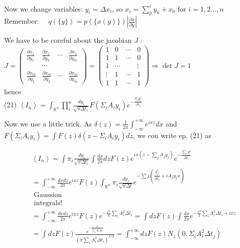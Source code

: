 \documentclass[10pt]{article}
\begin{document}
Now we change variables: $y_{i}=\Delta x_{i}$, so $x_{i}=\sum_{p}^{i} y_{k}+x_{0}$ for $i=1,2 \ldots, n$\\
Remember: $\quad q(\{y\})=p(\{x(y)\})\left|\frac{\partial x}{\partial y}\right|$

We have to be coreful about the jacobian $J$ :\\
$J=\left(\begin{array}{cccc}\frac{\partial x_{1}}{\partial y_{1}} & \frac{\partial x_{1}}{\partial y_{2}} & \cdots & \frac{\partial x_{1}}{\partial y_{m}} \\ & \cdots & & \\ \frac{\partial x_{m}}{\partial y_{1}} & \frac{\partial x_{m}}{\partial y_{2}} & \cdots & \frac{\partial x_{m}}{\partial y_{m}}\end{array}\right)=\left(\begin{array}{cccc}1 & 0 & \cdots & 0 \\ 1 & 1 & \cdots & 0 \\ 1 & \cdots & & \vdots \\ \vdots & 1 & \cdots & 1 \\ 1 & 1 & \cdots & 1\end{array}\right) \Rightarrow \operatorname{det} J=1$\\
hence\\
(21) $\left\langle I_{n}\right\rangle=\int_{\mathbb{R}^{n}} \prod_{i}^{n} \frac{d y_{i}}{\sqrt{\pi \Delta t_{i}}} F\left(\Sigma_{i} A_{i} y_{i}\right) e^{-\frac{\Sigma_{i} y_{i}^{2}}{\Delta t_{i}}}$

Now we use a little trick. As $\delta(z)=\frac{1}{2 \pi} \int_{-\infty}^{+\infty} e^{i x z} d x$ and $F\left(\Sigma_{i} A_{i} y_{i}\right)=\int F(z) \delta\left(z-\Sigma_{i} A_{i} y_{i}\right) d z$, we con write ep. (21) as

$$
\begin{aligned}
& \left\langle I_{n}\right\rangle=\int \pi_{i} \frac{d y_{i}}{\sqrt{\pi \Delta t_{i}}} \int \frac{d x}{2 \pi} d z F(z) e^{i x\left(z-\sum_{j} A_{j} y_{j}\right)} e^{-\frac{\sum_{i} y_{i}^{2}}{\Delta t_{i}}} \\
& =\int_{-\infty}^{+\infty} \frac{d x d z}{2 \pi} e^{i x z} F(z) \int_{\mathbb{R}^{n}} \pi_{i} \frac{d y_{i}}{\sqrt{\pi \Delta t}} e^{-\sum j\left(\frac{y_{j}^{2}}{\Delta t_{j}}+i A_{j} y_{j} x\right)} \\
& \text { Gaussion } \\
& \text { integrals! } \\
& =\int_{-\infty}^{+\infty} \frac{d x d z}{2 \pi} e^{i x z} F(z) e^{-\frac{x^{2}}{4} \sum_{i} A_{i}^{2} \Delta t_{i}}=\int d z F(z) \int \frac{d x}{2 \pi} e^{-\frac{x^{2}}{4} \sum_{i} A_{i}^{2} \Delta t_{i}+i x z} \\
& =\int d z F(z) \frac{e^{-\frac{z^{2}}{\sum_{i} A_{i}^{2} \Delta t_{i}}}}{\left(\pi \sum_{i} A_{i}^{2} \Delta t_{i}\right)^{1 / 2}}=\int_{-\infty}^{+\infty} d z F(z) N_{z}\left(0, \Sigma_{i} A_{i}^{2} \Delta t_{j}\right)
\end{aligned}
$$
\end{document}
